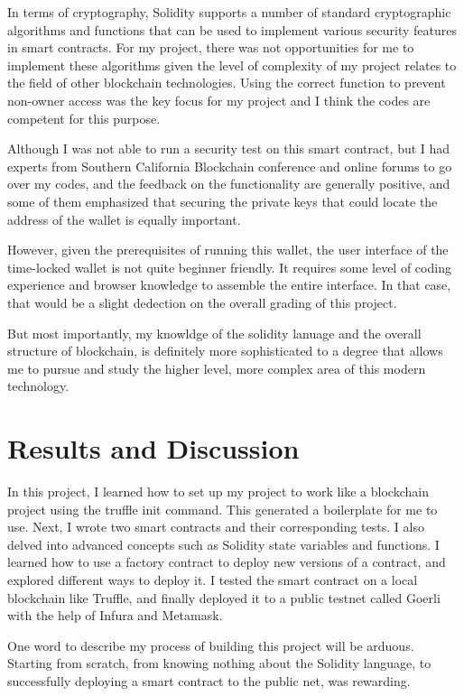 \documentclass[10pt,twocolumn]{article}
\begin{document}
In terms of cryptography, Solidity supports a number of standard cryptographic algorithms and functions that can be used to implement various security features in smart contracts. For my project, there was not opportunities for me to implement these algorithms given the level of complexity of my project relates to the field of other blockchain technologies. Using the correct function to prevent non-owner access was the key focus for my project and I think the codes are competent for this purpose.

Although I was not able to run a security test on this smart contract, but I had experts from Southern California Blockchain conference and online forums to go over my codes, and the feedback on the functionality are generally positive, and some of them emphasized that securing the private keys that could locate the address of the wallet is equally important.

However, given the prerequisites of running this wallet, the user interface of the time-locked wallet is not quite beginner friendly. It requires some level of coding experience and browser knowledge to assemble the entire interface. In that case, that would be a slight dedection on the overall grading of this project.

But most importantly, my knowldge of the solidity lanuage and the overall structure of blockchain, is definitely more sophisticated to a degree that allows me to pursue and study the higher level, more complex area of this modern technology.

\section{Results and Discussion}
In this project, I learned how to set up my project to work like a blockchain project using the truffle init command. This generated a boilerplate for me to use. Next, I wrote two smart contracts and their corresponding tests. I also delved into advanced concepts such as Solidity state variables and functions. I learned how to use a factory contract to deploy new versions of a contract, and explored different ways to deploy it. I tested the smart contract on a local blockchain like Truffle, and finally deployed it to a public testnet called Goerli with the help of Infura and Metamask.

One word to describe my process of building this project will be arduous. Starting from scratch, from knowing nothing about the Solidity language, to successfully deploying a smart contract to the public net, was rewarding.
\end{document}

